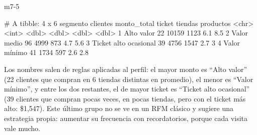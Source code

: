 \begin{solucion}{m7-5}
\begin{rsalida}
# A tibble: 4 x 6
  segmento              clientes monto_total ticket tiendas productos
  <chr>                    <int>       <dbl>  <dbl>   <dbl>     <dbl>
1 Alto valor                  22       10159   1123     6.1       8.5
2 Valor medio                 96        4999    873     4.7       5.6
3 Ticket alto ocasional       39        4756   1547     2.7       3  
4 Valor mínimo                41        1734    597     2.6       2.8
\end{rsalida}

Los nombres salen de reglas aplicadas al perfil: el mayor monto es ``Alto
valor'' (22 clientes que compran en 6 tiendas distintas en promedio), el menor
es ``Valor mínimo'', y entre los dos restantes, el de mayor ticket es ``Ticket
alto ocasional'' (39 clientes que compran pocas veces, en pocas tiendas, pero
con el ticket más alto: \$1{,}547). Este último grupo no se ve en un RFM
clásico y sugiere una estrategia propia: aumentar su frecuencia con
recordatorios, porque cada visita vale mucho.
\end{solucion}

